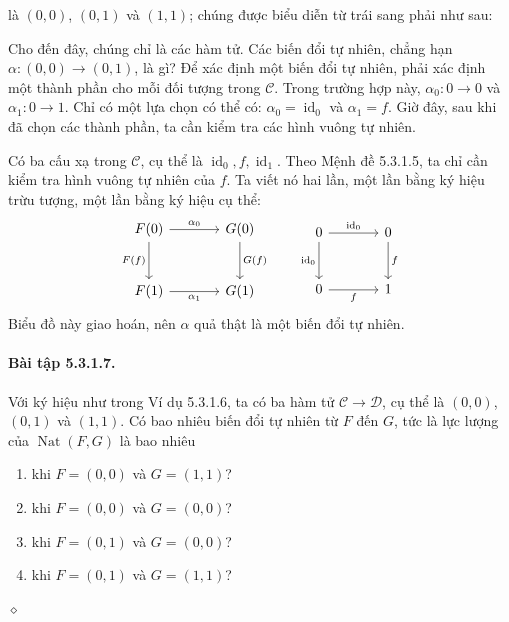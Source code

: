 là $(0,0)$, $(0,1)$ và $(1,1)$; chúng được biểu diễn từ trái sang phải như sau:
\begin{center}\end{center}
Cho đến đây, chúng chỉ là các hàm tử. Các biến đổi tự nhiên, chẳng hạn $\alpha:(0,0)\to(0,1)$, là gì? Để xác định một biến đổi tự nhiên, phải xác định một thành phần cho mỗi đối tượng trong $\mathcal C$. Trong trường hợp này, $\alpha_0:0\to0$ và $\alpha_1:0\to1$. Chỉ có một lựa chọn có thể có: $\alpha_0=\operatorname{id}_0$ và $\alpha_1=f$. Giờ đây, sau khi đã chọn các thành phần, ta cần kiểm tra các hình vuông tự nhiên.

Có ba cấu xạ trong $\mathcal C$, cụ thể là $\operatorname{id}_0,f,\operatorname{id}_1$. Theo Mệnh đề 5.3.1.5, ta chỉ cần kiểm tra hình vuông tự nhiên của $f$. Ta viết nó hai lần, một lần bằng ký hiệu trừu tượng, một lần bằng ký hiệu cụ thể:
\[\begin{tikzcd}[column sep=large,row sep=large]
F(0)\arrow[r,"\alpha_0"]\arrow[d,"F(f)"']&G(0)\arrow[d,"G(f)"]\\F(1)\arrow[r,"\alpha_1"']&G(1)
\end{tikzcd}\qquad\begin{tikzcd}[column sep=large,row sep=large]
0\arrow[r,"\operatorname{id}_0"]\arrow[d,"\operatorname{id}_0"']&0\arrow[d,"f"]\\0\arrow[r,"f"']&1
\end{tikzcd}\]
Biểu đồ này giao hoán, nên $\alpha$ quả thật là một biến đổi tự nhiên.
\paragraph{Bài tập 5.3.1.7.} Với ký hiệu như trong Ví dụ 5.3.1.6, ta có ba hàm tử $\mathcal C\to\mathcal D$, cụ thể là $(0,0)$, $(0,1)$ và $(1,1)$. Có bao nhiêu biến đổi tự nhiên từ $F$ đến $G$, tức là lực lượng của $\operatorname{Nat}(F,G)$ là bao nhiêu
\begin{enumerate}[label=\alph*.]
\item khi $F=(0,0)$ và $G=(1,1)$?
\item khi $F=(0,0)$ và $G=(0,0)$?
\item khi $F=(0,1)$ và $G=(0,0)$?
\item khi $F=(0,1)$ và $G=(1,1)$?
\end{enumerate}\hfill$\diamond$
